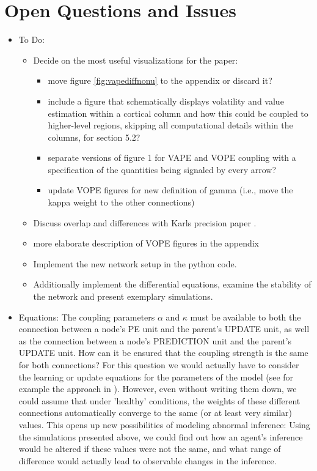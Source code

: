 \section{Open Questions and Issues}

\begin{itemize}
	\item To Do: 
	\begin{itemize}
		\item Decide on the most useful visualizations for the paper: 
		\begin{itemize}
			\item move figure \ref{fig:vapediffnonu} to the appendix or discard it?
			\item include a figure that schematically displays volatility and value estimation within a cortical column and how this could be coupled to higher-level regions, skipping all computational details within the columns, for section 5.2?
			\item separate versions of figure 1 for VAPE and VOPE coupling with a specification of the quantities being signaled by every arrow?
			\item update VOPE figures for new definition of gamma (i.e., move the kappa weight to the other connections)
		\end{itemize}
		\item Discuss overlap and differences with Karls precision paper \cite{Kanai2015}.
		\item more elaborate description of VOPE figures in the appendix
		\item Implement the new network setup in the python code.
		\item Additionally implement the differential equations, examine the stability of the network and present exemplary simulations. 
		\end{itemize}
	
	\item Equations: The coupling parameters $\alpha$ and $\kappa$ must be available to both the connection between a node's \textsf{PE unit} and the parent's \textsf{UPDATE unit}, as well as the connection between a node's \textsf{PREDICTION unit} and the parent's \textsf{UPDATE unit}. How can it be ensured that the coupling strength is the same for both connections? For this question we would actually have to consider the learning or update equations for the parameters of the model (see for example the approach in \cite{Bogacz2017}). However, even without writing them down, we could assume that under 'healthy' conditions, the weights of these different connections automatically converge to the same (or at least very similar) values. This opens up new possibilities of modeling abnormal inference: Using the simulations presented above, we could find out how an agent's inference would be altered if these values were not the same, and what range of difference would actually lead to observable changes in the inference. 


\end{itemize}

